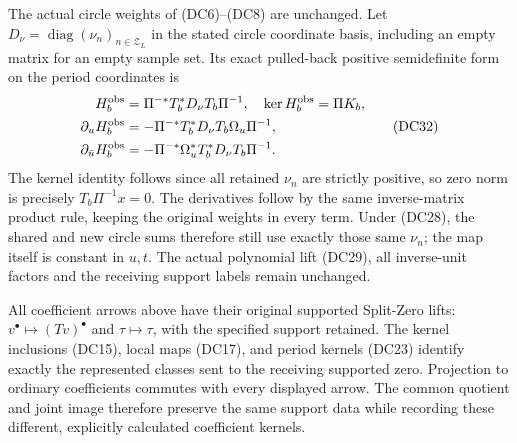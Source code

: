 The actual circle weights of (DC6)--(DC8) are unchanged.
Let $D_\nu=\operatorname{diag}(\nu_n)_{n\in\mathcal Z_L}$
in the stated circle coordinate basis, including an empty
matrix for an empty sample set.  Its exact pulled-back
positive semidefinite form on the period coordinates is
\[
 \begin{aligned}
 H_b^{\rm obs}&=\Pi^{-*}T_b^*D_\nu T_b\Pi^{-1},
 \quad\ker H_b^{\rm obs}=\Pi K_b,\\
 \partial_uH_b^{\rm obs}
       &=-\Pi^{-*}T_b^*D_\nu T_b\Omega_u\Pi^{-1},\\
 \partial_{\bar u}H_b^{\rm obs}
       &=-\Pi^{-*}\Omega_u^*T_b^*D_\nu T_b\Pi^{-1}.
 \end{aligned}
 \tag{DC32}
\]
The kernel identity follows since all retained $\nu_n$ are
strictly positive, so zero norm is precisely $T_b\Pi^{-1}x=0$.
The derivatives follow by the same inverse-matrix product
rule, keeping the original weights in every term.
Under (DC28), the shared and new circle sums therefore still
use exactly those same $\nu_n$; the map itself is constant in
$u,t$.  The actual polynomial lift (DC29), all inverse-unit
factors and the receiving support labels remain unchanged.

All coefficient arrows above have their original supported
Split-Zero lifts: $v^\bullet\mapsto(Tv)^\bullet$ and
$\tau\mapsto\tau$, with the specified support retained.
The kernel inclusions (DC15), local maps (DC17), and period
kernels (DC23) identify exactly the represented classes sent to
the receiving supported zero.  Projection to ordinary
coefficients commutes with every displayed arrow.  The common
quotient and joint image therefore preserve the same support
data while recording these different, explicitly calculated
coefficient kernels.


\endgroup
